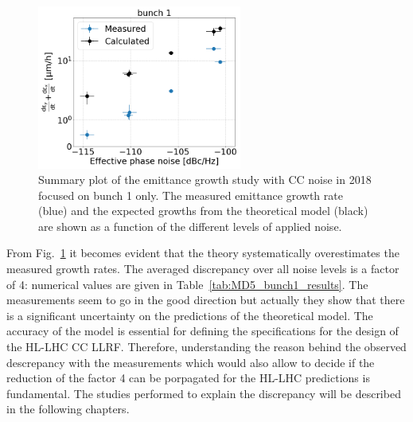 \begin{figure}[!h]
   \centering         
   \includegraphics[width=0.6\textwidth]{images/Ch5/MD5_summary_bunch1_backg_subtracted_vs_theory.png}
       \caption{Summary plot of the emittance growth study with CC noise in 2018 focused on bunch 1 only. The measured emittance growth rate (blue) and the expected growths from the theoretical model (black) are shown as a function of the different levels of applied noise.}
       \label{fig:MD5_bunch1_theory_vs_meas}
\end{figure}


From Fig.~\ref{fig:MD5_bunch1_theory_vs_meas} it becomes evident that the theory systematically overestimates the measured growth rates. The averaged discrepancy over all noise levels is a factor of 4: numerical values are given in Table~\ref{tab:MD5_bunch1_results}. The measurements seem to go in the good direction but actually they show that there is a significant uncertainty on the predictions of the theoretical model. The accuracy of the model is essential for defining the specifications for the design of the HL-LHC CC LLRF. Therefore, understanding the reason behind the observed descrepancy with the measurements which would also allow to decide if the reduction of the factor 4 can be porpagated for the HL-LHC predictions is fundamental. The studies performed to explain the discrepancy will be described in the following chapters.



